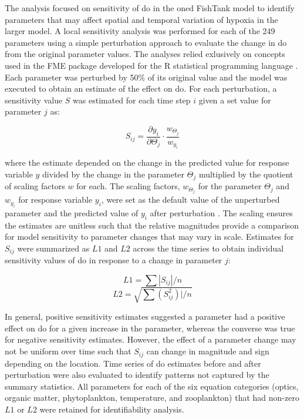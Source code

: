 \documentclass[letterpaper,12pt,oneside]{article}\usepackage[]{graphicx}\usepackage[]{color}
\begin{document}
The analysis focused on sensitivity of \ac{do} in the \ac{oned} FishTank model to identify parameters that may affect spatial and temporal variation of hypoxia in the larger model.  A local sensitivity analysis was performed for each of the 249 parameters using a simple perturbation approach to evaluate the change in \ac{do} from the original parameter values.  The analyses relied exlusively on concepts used in the FME package developed for the R statistical programming language \citep{Soetaert10}. Each parameter was perturbed by 50\% of its original value and the model was executed to obtain an estimate of the effect on \ac{do}.  For each perturbation, a sensitivity value $S$ was estimated for each time step $i$ given a set value for parameter $j$ as:

\begin{equation} \label{sijeqn}
S_{ij} = \frac{\partial y_i}{\partial \Theta_j}\cdot\frac{w_{\Theta_j}}{w_{y_i}}
\end{equation}

\noindent where the estimate depended on the change in the predicted value for response variable $y$ divided by the change in the parameter $\Theta_j$ multiplied by the quotient of scaling factors $w$ for each.  The scaling factors, $w_{\Theta_j}$ for the parameter $\Theta_j$ and $w_{y_i}$ for response variable $y_i$, were set as the default value of the unperturbed parameter and the predicted value of $y_i$ after perturbation \citep{Soetaert10}.  The scaling ensures the estimates are unitless such that the relative magnitudes provide a comparison for model sensitivity to parameter changes that may vary in scale.  Estimates for $S_{ij}$ were summarized as $L1$ and $L2$ across the time series to obtain individual sensitivity values of \ac{do} in response to a change in parameter $j$:

\begin{equation} \label{l1}
L1 = \sum|S_{ij}|/n
\end{equation}
\begin{equation} \label{l2}
L2 = \sqrt{\sum\left(S_{ij}^2\right)|/n}
\end{equation}

In general, positive sensitivity estimates suggested a parameter had a positive effect on \ac{do} for a given increase in the parameter, whereas the converse was true for negative sensitivity estimates.  However, the effect of a parameter change may not be uniform over time such that $S_{ij}$ can change in magnitude and sign depending on the location.  Time series of \ac{do} estimates before and after perturbation were also evaluated to identify patterns not captured by the summary statistics. All parameters for each of the six equation categories (optics, organic matter, phytoplankton, temperature, and zooplankton) that had non-zero $L1$ or $L2$ were retained for identifiability analysis.  
\end{document}
